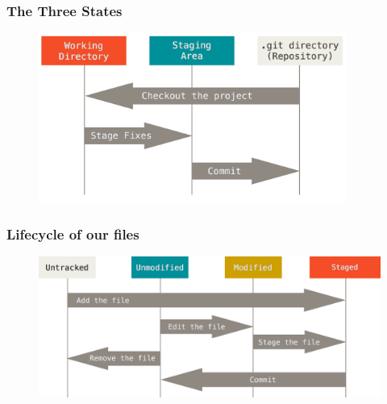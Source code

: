 \begin{frame}
    \frametitle{The Three States}
    \begin{figure}[b]{\textwidth}
        \centering
        \includegraphics[width=0.9\textwidth]{../img/three_states.png}
    \end{figure}
\end{frame}

\begin{frame}
    \frametitle{Lifecycle of our files}
    \begin{figure}[b]{\textwidth}
        \centering
            \includegraphics[width=\textwidth]{../img/file_lifecycle.png}
    \end{figure}
\end{frame}

